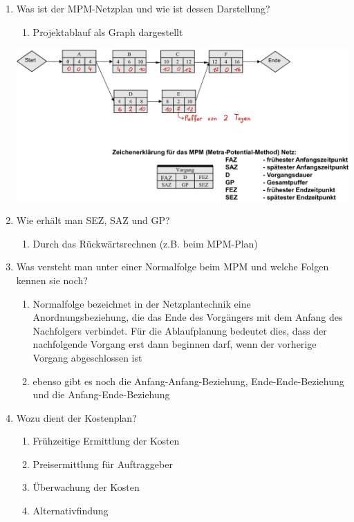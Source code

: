 \documentclass[12pt,a4paper]{article}
\begin{document}
\begin{enumerate}
\begin{center}
	\end{center}
	\item Was ist der MPM-Netzplan und wie ist dessen Darstellung?
	\begin{enumerate}
		\item Projektablauf als Graph dargestellt
	\end{enumerate}
	\begin{center}
		\includegraphics[scale=.175]{Bilder/MPM.JPG}	
	\end{center}
	\item Wie erhält man SEZ, SAZ und GP?
	\begin{enumerate}
		\item Durch das Rückwärtsrechnen (z.B. beim MPM-Plan)
	\end{enumerate}
	\item Was versteht man unter einer Normalfolge beim MPM und welche Folgen kennen sie noch?
	\begin{enumerate}
			\item Normalfolge bezeichnet in der Netzplantechnik eine Anordnungsbeziehung, die das Ende des Vorgängers mit dem Anfang des Nachfolgers verbindet. Für die Ablaufplanung bedeutet dies, dass der nachfolgende Vorgang erst dann beginnen darf, wenn der vorherige Vorgang abgeschlossen ist
			\item ebenso gibt es noch die Anfang-Anfang-Beziehung, Ende-Ende-Beziehung und die Anfang-Ende-Beziehung
	\end{enumerate}
	\item Wozu dient der Kostenplan?
	\begin{enumerate}
		\item Frühzeitige Ermittlung der Kosten
		\item Preisermittlung für Auftraggeber
		\item Überwachung der Kosten
		\item Alternativfindung
	\end{enumerate}

\end{enumerate}
\end{document}
